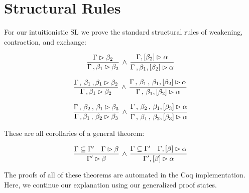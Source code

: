 \section{Structural Rules}
\label{sec:structrules}

For our intuitionistic SL we prove the standard structural rules of weakening, contraction, and exchange:
\begin{thm}
$$
\vcenter{\infer{\seqsl[\dyncon{} \, , \beta_1]{\beta_2}}{\seqsl{\beta_2}}} \; \wedge \; \vcenter{\infer{\bchsl[\dyncon{} \, , \beta_1]{\beta_2}{\alpha}}{\bchsl{\beta_2}{\alpha}}}
$$
\end{thm}

\begin{thm}
$$
\vcenter{\infer{\seqsl[\dyncon{} \, , \beta_1]{\beta_2}}{\seqsl[\dyncon{} \, , \, \beta_1 \, , \beta_1]{\beta_2}}} \; \wedge \; \vcenter{\infer{\bchsl[\dyncon{} \, , \, \beta_1]{\beta_2}{\alpha}}{\bchsl[\dyncon{} \, , \, \beta_1 \, , \, \beta_1]{\beta_2}{\alpha}}}
$$
\end{thm}

\begin{thm}
$$
\vcenter{\infer{\seqsl[\dyncon{} \, , \beta_1 \, , \, \beta_2]{\beta_3}}{\seqsl[\dyncon{} \, , \, \beta_2 \, , \, \beta_1]{\beta_3}}} \; \wedge \; \vcenter{\infer{\bchsl[\dyncon{} \, , \, \beta_1 \, , \, \beta_2]{\beta_3}{\alpha}}{\bchsl[\dyncon{} \, , \, \beta_2 \, , \, \beta_1]{\beta_3}{\alpha}}}
$$
\end{thm}

\noindent These are all corollaries of a general theorem:

\begin{theorem}
$$
\vcenter{\infer{\seqsl[\inddyncon{}]{\beta}}{\dyncon{} \subseteq \inddyncon{} & \seqsl[\dyncon{}]{\beta}}} \; \wedge \; \vcenter{\infer{\bchsl[\inddyncon{}]{\beta}{\alpha}}{\dyncon{} \subseteq \inddyncon{} & \bchsl[\dyncon{}]{\beta}{\alpha}}}
$$
\label{thm:monotone}
\end{theorem}

The proofs of all of these theorems are automated in the Coq implementation.
Here, we continue our explanation using our generalized proof states.

